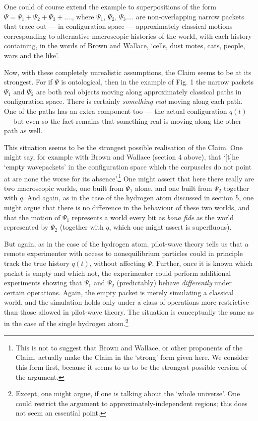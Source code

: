 \documentclass[12pt]{article}%
\begin{document}
One could of course extend the example to superpositions of the form
$\Psi=\Psi_{1}+\Psi_{2}+\Psi_{3}+....$, where $\Psi_{1}$, $\Psi_{2}$,
$\Psi_{3}$.... are non-overlapping narrow packets that trace out --- in
configuration space --- approximately classical motions corresponding to
alternative macroscopic histories of the world, with each history containing,
in the words of Brown and Wallace, `cells, dust motes, cats, people, wars and
the like'.

Now, with these completely unrealistic assumptions, the Claim seems to be at
its strongest. For if $\Psi$ is ontological, then in the example of Fig. 1 the
narrow packets $\Psi_{1}$ and $\Psi_{2}$ are both real objects moving along
approximately classical paths in configuration space. There is certainly
\textit{something real} moving along each path. One of the paths has an extra
component too --- the actual configuration $q(t)$ --- but even so the fact
remains that something real is moving along the other path as well.

This situation seems to be the strongest possible realisation of the Claim.
One might say, for example with Brown and Wallace (section 4 above), that
`[t]he `empty wavepackets' in the configuration space which the corpuscles do
not point at are none the worse for its absence'.\footnote{This is not to
suggest that Brown and Wallace, or other proponents of the Claim, actually
make the Claim in the `strong' form given here. We consider this form first,
because it seems to us to be the strongest possible version of the argument.}
One might assert that here there really are two macroscopic worlds, one built
from $\Psi_{1}$ alone, and one built from $\Psi_{2}$ together with $q$. And
again, as in the case of the hydrogen atom discussed in section 5, one might
argue that there is no difference in the behaviour of these two worlds, and
that the motion of $\Psi_{1}$ represents a world every bit as \textit{bona
fide} as the world represented by $\Psi_{2}$ (together with $q$, which one
might assert is superfluous).

But again, as in the case of the hydrogen atom, pilot-wave theory tells us
that a remote experimenter with access to nonequilibrium particles could in
principle track the true history $q(t)$, without affecting $\Psi$. Further,
once it is known which packet is empty and which not, the experimenter could
perform additional experiments showing that $\Psi_{1}$ and $\Psi_{2}$
(predictably) behave \textit{differently} under certain operations. Again, the
empty packet is merely simulating a classical world, and the simulation holds
only under a class of operations more restrictive than those allowed in
pilot-wave theory. The situation is conceptually the same as in the case of
the single hydrogen atom.\footnote{Except, one might argue, if one is talking
about the `whole universe'. One could restrict the argument to
approximately-independent regions; this does not seem an essential point.}
\end{document}
